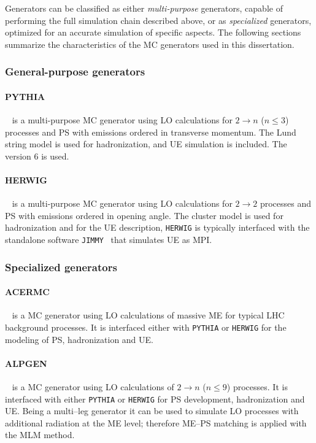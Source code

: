 Generators can be classified as either {\it multi-purpose}
generators, capable of performing the full simulation chain described
above, or as {\it specialized} generators, optimized for
an accurate simulation of specific aspects.
The following sections summarize the characteristics of the MC
generators used in this dissertation.

\subsubsection*{General-purpose generators}

\paragraph{PYTHIA}~\cite{pythia6} is a multi-purpose MC
generator using LO calculations for $2 \to n$ ($n\leq 3$) processes
and PS with emissions ordered in transverse momentum. 
The Lund string model is used for hadronization, and UE simulation is
included. The \pythia{} version 6 is used.

\paragraph{HERWIG}~\cite{herwig} is a multi-purpose MC generator using LO
calculations for $2 \to 2$ processes and PS with emissions ordered in
opening angle. 
The cluster model is used for hadronization and for the UE
description, \texttt{HERWIG} is typically interfaced with the
standalone software \texttt{JIMMY}~\cite{jimmy} that simulates UE as MPI.

\subsubsection*{Specialized generators}

\paragraph{ACERMC}~\cite{acermc} is a MC generator using LO
calculations of massive ME for typical LHC background processes. It is
interfaced either with \texttt{PYTHIA} or \texttt{HERWIG} for the
modeling of PS, hadronization and UE.

\paragraph{ALPGEN}~\cite{alpgen} is a MC generator using LO calculations
of $2 \to n$ ($n\leq 9$) processes. It is interfaced with either
\texttt{PYTHIA} or \texttt{HERWIG} for PS development,
hadronization and UE. Being a
multi--leg generator it can be used to simulate LO processes with
additional radiation at the ME level; therefore ME--PS matching is
applied with the MLM method.

